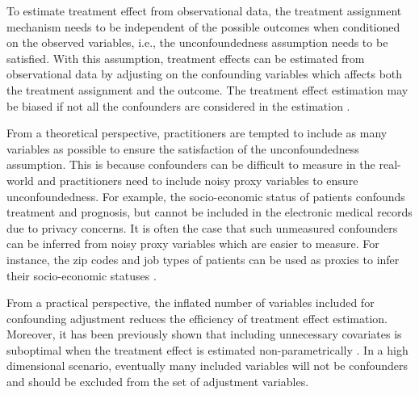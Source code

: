 \documentclass[letterpaper]{article} %
\begin{document}

To estimate treatment effect from observational data, the treatment assignment mechanism needs to be independent of the possible outcomes when conditioned on the observed variables, i.e., the unconfoundedness assumption \cite{Rosenbaum1983} needs to be satisfied. With this assumption, treatment effects can be estimated from observational data by adjusting on the confounding variables which affects both the treatment assignment and the outcome. The treatment effect estimation may be biased if not all the confounders are considered in the estimation \cite{Pearl2009}.

From a theoretical perspective, practitioners are tempted to include as many variables as possible to ensure the satisfaction of the unconfoundedness assumption.
This is because confounders can be difficult to measure in the real-world and practitioners need to include noisy proxy variables to ensure unconfoundedness.
For example, the socio-economic status of patients confounds treatment and prognosis, but cannot be included in the electronic medical records due to privacy concerns. It is often the case that such unmeasured confounders can be inferred from noisy proxy variables which are easier to measure. For instance, the zip codes and job types of patients can be used as proxies to infer their socio-economic statuses \cite{Sauer2013}.

From a practical perspective, the inflated number of variables included for confounding adjustment reduces the efficiency of treatment effect estimation.
Moreover, it has been previously shown that including unnecessary covariates is suboptimal when the treatment effect is estimated non-parametrically \cite{Hahn1998,Abadie2006,Haeggstroem2017}. In a high dimensional scenario, eventually many included variables will not be confounders and should be excluded from the set of adjustment variables.
\end{document}
